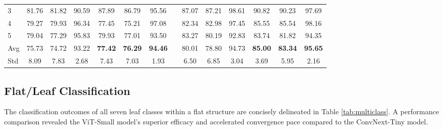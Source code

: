 \documentclass[runningheads]{llncs}
\begin{document}
\begin{table}[b]
{\begin{tabular}{@{}lccccccccccccc@{}}
3                                 & 81.76 & 81.82 & \multicolumn{1}{c|}{90.59} & 87.89           & 86.79           & 95.56          &           & 87.07 & 87.21 & \multicolumn{1}{c|}{98.61} & 90.82        & 90.23          & 97.69          \\
4                                 & 79.27                         & 79.93                         & \multicolumn{1}{c|}{96.34}                         & 77.45           & 75.21           & 97.08          &           & 82.34                         & 82.98                         & \multicolumn{1}{c|}{97.45}                         & 85.55        & 85.54          & 98.16          \\
5                                 & 79.04                         & 77.29                         & \multicolumn{1}{c|}{95.83}                         & 79.93           & 77.01           & 93.50           &           & 83.27                         & 80.19                         & \multicolumn{1}{c|}{92.83}                         & 83.74        & 81.82          & 94.35          \\
Avg                               & 75.73                        & 74.72                        & \multicolumn{1}{c|}{93.22}                        & \textbf{77.42} & \textbf{76.29} & \textbf{94.46} &           & 80.01                         & 78.80                        & \multicolumn{1}{c|}{94.73}                        & \textbf{85.00}  & \textbf{83.34} & \textbf{95.65} \\
Std                               & 8.09                          & 7.83                          & \multicolumn{1}{c|}{2.68}                          & 7.43            & 7.03            & 1.93           &           & 6.50                          & 6.85                          & \multicolumn{1}{c|}{3.04}                          & 3.69         & 5.95           & 2.16           \\ \bottomrule
\end{tabular}}
\end{table}


\subsection{Flat/Leaf Classification}
The classification outcomes of all seven leaf classes within a flat structure are concisely delineated in Table \ref{tab:multiclass}. A performance comparison revealed the ViT-Small model's superior efficacy and accelerated convergence pace compared to the ConvNext-Tiny model.
\end{document}
